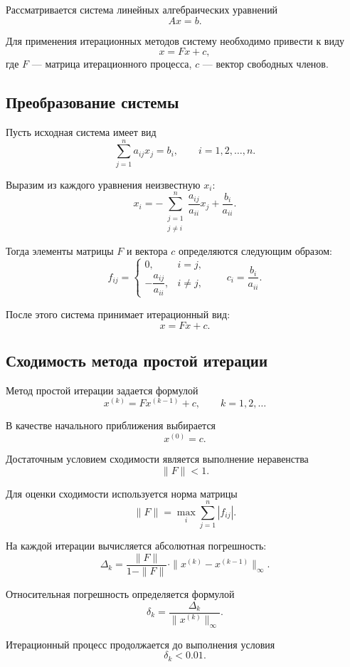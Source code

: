 Рассматривается система линейных алгебраических уравнений
\[
    Ax = b.
\]

Для применения итерационных методов систему необходимо привести к виду
\[
    x = Fx + c,
\]
где $F$ — матрица итерационного процесса, $c$ — вектор свободных членов.

\subsection*{Преобразование системы}

Пусть исходная система имеет вид
\[
    \sum_{j=1}^{n} a_{ij}x_j = b_i,
    \qquad i = 1,2,\ldots,n.
\]

Выразим из каждого уравнения неизвестную $x_i$:
\[
    x_i =
    -\sum_{\substack{j=1 \\ j \ne i}}^{n}
    \frac{a_{ij}}{a_{ii}}x_j
    +
    \frac{b_i}{a_{ii}}.
\]

Тогда элементы матрицы $F$ и вектора $c$ определяются следующим образом:
\[
f_{ij} =
\begin{cases}
0, & i = j, \\
-\dfrac{a_{ij}}{a_{ii}}, & i \ne j,
\end{cases}
\qquad
c_i = \frac{b_i}{a_{ii}}.
\]

После этого система принимает итерационный вид:
\[
    x = Fx + c.
\]

\subsection*{Сходимость метода простой итерации}

Метод простой итерации задается формулой
\[
    x^{(k)} = Fx^{(k-1)} + c,
    \qquad k = 1,2,\ldots
\]

В качестве начального приближения выбирается
\[
    x^{(0)} = c.
\]

Достаточным условием сходимости является выполнение неравенства
\[
    \|F\| < 1.
\]

Для оценки сходимости используется норма матрицы
\[
    \|F\| =
    \max_i \sum_{j=1}^{n} |f_{ij}|.
\]

На каждой итерации вычисляется абсолютная погрешность:
\[
    \Delta_k =
    \frac{\|F\|}{1 - \|F\|}
    \cdot
    \|x^{(k)} - x^{(k-1)}\|_{\infty}.
\]

Относительная погрешность определяется формулой
\[
    \delta_k =
    \frac{\Delta_k}{\|x^{(k)}\|_{\infty}}.
\]

Итерационный процесс продолжается до выполнения условия
\[
    \delta_k < 0.01.
\]

